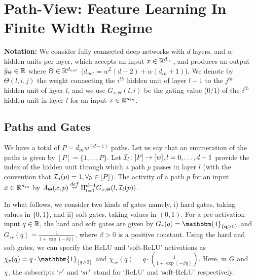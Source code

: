 \section{Path-View:  Feature Learning In Finite Width Regime}\label{sec:pathgate}
\textbf{Notation:} We consider fully connected deep networks with $d$ layers, and $w$ hidden units per layer, which accepts an input $x\in\mathbb{R}^{d_{in}}$, and produces an output $\hat{y}_{\Theta}\in \mathbb{R}$ where $\Theta\in\mathbb{R}^{d_{net}}$ ($d_{net}=w^2(d-2)+w(d_{in}+1)$). We denote by $\Theta(l,i,j)$ the weight connecting the $i^{th}$ hidden unit of layer $l-1$ to the $j^{th}$ hidden unit of layer $l$, and we use $G_{x,\Theta}(l,i)$ be the gating value ($0/1$) of the $i^{th}$ hidden unit in layer $l$ for an input $x\in \mathbb{R}^{d_{in}}$.
\subsection{Paths and Gates}
We have a total of $P=d_{in}w^{(d-1)}$ paths. Let us say that an enumeration of the paths is given by $[P]=\{1,\ldots,P\}$. Let $\mathcal{I}_{l}\colon [P]\rightarrow [w],l=0,\ldots,d-1$ provide the index of the hidden unit through which a path $p$ passes in layer $l$ (with the convention that $\mathcal{I}_d(p)=1,\forall p\in [P]$). The activity of a path $p$ for an input $x\in \mathbb{R}^{d_{in}}$ by $A_{\Theta}(x,p)\stackrel{def}{=}\Pi_{l=1}^{d-1} G_{x,\Theta}(l,\mathcal{I}_l(p))$.

In what follows, we consider two kinds of gates namely, i) hard gates, taking values in $\{0,1\}$, and ii) soft gates, taking values in $(0,1)$. For a pre-activation input $q\in\mathbb{R}$, the  hard and soft gates are given by $G_{r}(q)=\mathbbm{1}_{\{\q>0\}}$ and $G_{sr}(q)=\frac{1}{1+\exp(-\beta q)}$, where $\beta>0$ is a positive constant. Using the hard and soft gates, we can specify the ReLU and `soft-ReLU' activations as $\chi_{r}(q)=q\cdot\mathbbm{1}_{\{q>0\}}$ and $\chi_{sr}(q)=q\cdot\left(\frac{1}{1+\exp(-\beta q)}\right)$. Here, in $G$ and $\chi$, the subscripts $`r'$ and $`sr'$ stand for `ReLU' and `soft-ReLU' respectively.
